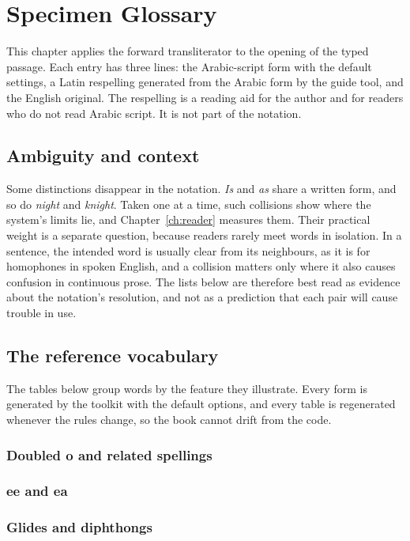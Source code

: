 \chapter{Specimen Glossary}
This chapter applies the forward transliterator to the opening of the typed passage. Each entry has three lines: the Arabic-script form with the default settings, a Latin respelling generated from the Arabic form by the guide tool, and the English original. The respelling is a reading aid for the author and for readers who do not read Arabic script. It is not part of the notation.



\section{Ambiguity and context}
Some distinctions disappear in the notation. \emph{Is} and \emph{as} share a written form, and so do \emph{night} and \emph{knight}. Taken one at a time, such collisions show where the system's limits lie, and Chapter~\ref{ch:reader} measures them. Their practical weight is a separate question, because readers rarely meet words in isolation. In a sentence, the intended word is usually clear from its neighbours, as it is for homophones in spoken English, and a collision matters only where it also causes confusion in continuous prose. The lists below are therefore best read as evidence about the notation's resolution, and not as a prediction that each pair will cause trouble in use.

\section{The reference vocabulary}
The tables below group words by the feature they illustrate. Every form is generated by the toolkit with the default options, and every table is regenerated whenever the rules change, so the book cannot drift from the code.

\subsection{Doubled o and related spellings}


\subsection{ee and ea}


\subsection{Glides and diphthongs}


